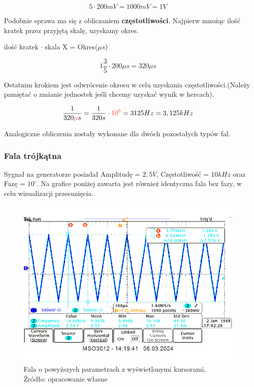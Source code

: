 \documentclass{article}
\begin{document}
        \begin{equation}
          5 \cdot 200mV = 1000 mV = 1V
        \end{equation}

        Podobnie sprawa ma się z obliczaniem \textbf{częstotliwości}. Najpierw mnożąc ilość kratek przez przyjętą skalę, uzyskamy okres.

        \begin{center}
          ilość kratek $\cdot$ skala X = Okres($\mu s$)
        \end{center}

        \begin{equation}
          1\frac{3}{5} \cdot 200\mu s = 320 \mu s
        \end{equation}

        \pagebreak

        Ostatnim krokiem jest odwrócenie okresu w celu uzyskania częstotliwości.(Należy pamiętać o zmianie jednostek jeśli chcemy uzyskać wynik w hercach).

        \begin{equation}
          \frac{1}{320 \textcolor{red}{\mu} s} = \frac{1}{320s} \cdot \textcolor{red}{10^6} = 3 125 Hz = 3,125 kHz
        \end{equation}

        Analogiczne obliczenia zostały wykonane dla dwóch pozostałych typów fal.

      \subsubsection{Fala trójkątna}
        Sygnał na generatorze posiadał Amplitudę = $2,5V$, Częstotliwość = $10 kHz$ oraz Fazę = $10^\circ$. Na grafice poniżej zawarta jest również identyczna fala bez fazy, w celu wizualizacji przesunięcia.

        \begin{figure}[!ht]
          \begin{center}
              \includegraphics[scale=0.4]{grafiki/kursor_ver.png}
              \caption{Fala o powyższych parametrach z wyświetlonymi kursorami,\\Źródło: opracowanie własne}
          \end{center}
        \end{figure}
\end{document}
